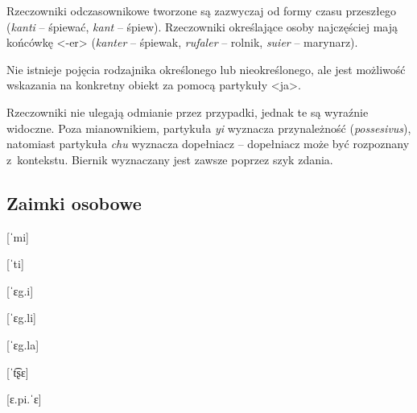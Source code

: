 \begin{spacing}{1.1}
Rzeczowniki odczasownikowe tworzone są zazwyczaj od formy czasu przeszłego
(\emph{kanti} -- śpiewać, \emph{kant} -- śpiew). Rzeczowniki określające osoby
najczęściej mają końcówkę <-er> (\emph{kanter} -- śpiewak, \emph{rufaler} --
rolnik, \emph{suier} -- marynarz).

Nie istnieje pojęcia rodzajnika określonego lub nieokreślonego, ale jest
możliwość wskazania na konkretny obiekt za pomocą partykuły <ja>.


Rzeczowniki nie ulegają odmianie przez przypadki, jednak te są wyraźnie
widoczne. Poza mianownikiem, partykuła \emph{yi} wyznacza przynależność
(\emph{possesivus}), natomiast partykuła \emph{chu} wyznacza dopełniacz --
dopełniacz może być rozpoznany z~kontekstu. Biernik wyznaczany jest zawsze
poprzez szyk zdania.


\subsection{Zaimki osobowe}

\begin{multicols}{2}

[ˈmi]

[ˈti]

[ˈɛg.i]

[ˈɛg.li]

[ˈɛg.la]

[ˈt͡ʂɛ]

[ɛ.pi.ˈɛ]


\end{multicols}
\end{spacing}
